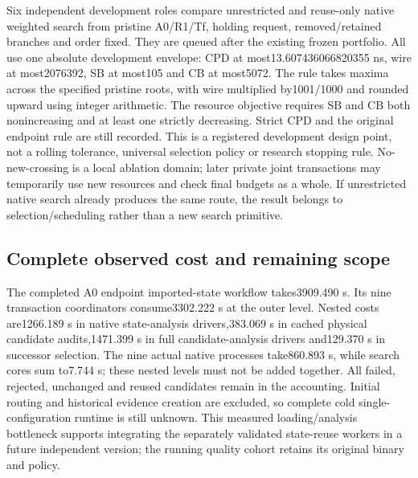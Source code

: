 Six independent development roles compare unrestricted and reuse-only native weighted search from pristine A0/R1/Tf, holding request, removed/retained branches and order fixed. They are queued after the existing frozen portfolio. All use one absolute development envelope: CPD at most13.607436066820355 ns, wire at most2076392, SB at most105 and CB at most5072. The rule takes maxima across the specified pristine roots, with wire multiplied by1001/1000 and rounded upward using integer arithmetic. The resource objective requires SB and CB both nonincreasing and at least one strictly decreasing. Strict CPD and the original endpoint rule are still recorded. This is a registered development design point, not a rolling tolerance, universal selection policy or research stopping rule. No-new-crossing is a local ablation domain; later private joint transactions may temporarily use new resources and check final budgets as a whole. If unrestricted native search already produces the same route, the result belongs to selection/scheduling rather than a new search primitive.

\subsection{Complete observed cost and remaining scope}
The completed A0 endpoint imported-state workflow takes3909.490 s. Its nine transaction coordinators consume3302.222 s at the outer level. Nested costs are1266.189 s in native state-analysis drivers,383.069 s in cached physical candidate audits,1471.399 s in full candidate-analysis drivers and129.370 s in successor selection. The nine actual native processes take860.893 s, while search cores sum to7.744 s; these nested levels must not be added together. All failed, rejected, unchanged and reused candidates remain in the accounting. Initial routing and historical evidence creation are excluded, so complete cold single-configuration runtime is still unknown. This measured loading/analysis bottleneck supports integrating the separately validated state-reuse workers in a future independent version; the running quality cohort retains its original binary and policy.
